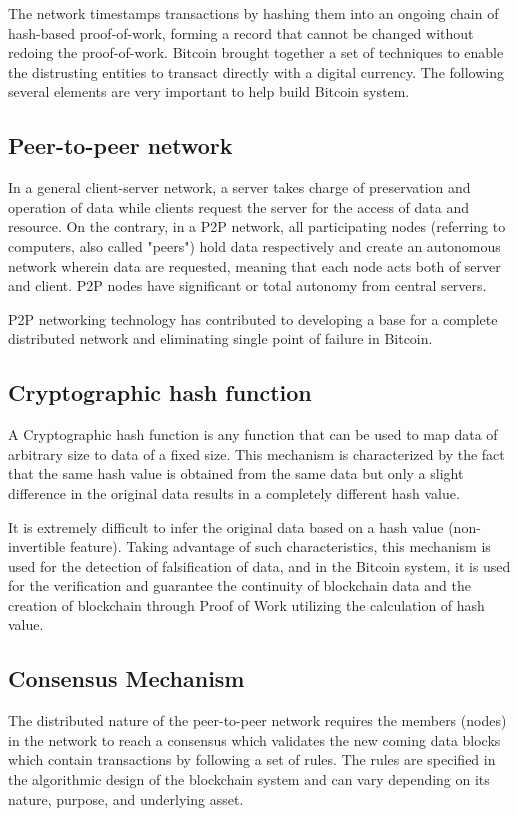 The network timestamps transactions by hashing them into an ongoing chain of hash-based proof-of-work, forming a record that cannot be changed without redoing the proof-of-work.\cite{sn} Bitcoin brought together a set of  techniques to enable the distrusting entities to transact directly with a digital currency. The following several elements are very important to help build Bitcoin system.

\subsection{Peer-to-peer network}

 In a general client-server network, a server takes charge of preservation and operation of data while clients request the server for the access of data and resource. On the contrary, in a P2P network, all participating nodes (referring to computers, also called "peers") hold data respectively and create an autonomous network wherein data are requested, meaning that each node acts both of server and client. P2P nodes have significant or total autonomy from central servers.

P2P networking technology has contributed to developing a base for a complete distributed network and eliminating single point of failure in Bitcoin.

\subsection{Cryptographic hash function}
A Cryptographic hash function is any function that can be used to map data of arbitrary size to data of a fixed size. This mechanism is characterized by the fact that the same hash value is obtained from the same data but only a slight difference in the original data results in a completely different hash value.

It is extremely difficult to infer the original data based on a hash value (non-invertible feature). Taking advantage of such characteristics, this mechanism is used for the detection of falsification of data, and in the Bitcoin system, it is used for the verification and guarantee the continuity of blockchain data and the creation of blockchain through Proof of Work utilizing the calculation of hash value.

\subsection{Consensus Mechanism}
The distributed nature of the peer-to-peer network requires the members (nodes) in the network to reach a consensus which validates the new coming data blocks which contain transactions by following a set of rules. The rules are specified in the algorithmic design of the blockchain system and can vary depending on its nature, purpose, and underlying asset.

